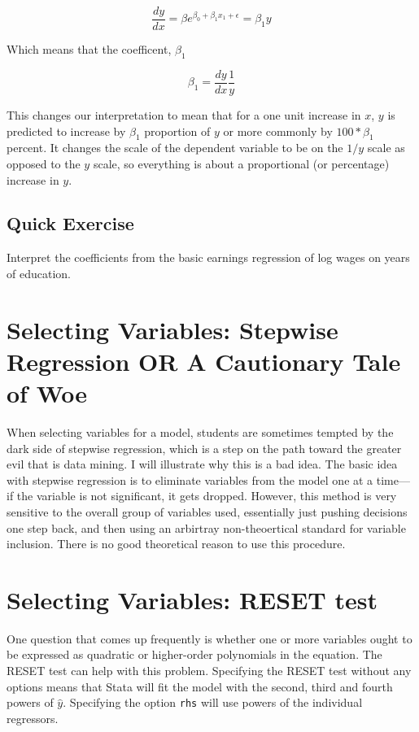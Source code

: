 \documentclass[12pt]{article}
\begin{document}
\begin{equation*}
  \frac{dy}{dx}=\beta e^{\beta_0+\beta_1x_1+\epsilon}=\beta_1y
\end{equation*}

Which means that the coefficent, $\beta_1$

\begin{equation*}
  \beta_1=\frac{dy}{dx}\frac{1}{y}
\end{equation*}

This changes our interpretation to mean that for a one unit increase
in $x$, $y$ is predicted to increase by $\beta_1$ proportion of $y$ or
more commonly by $100*\beta_1$ percent. It changes the scale of the
dependent variable to be on the $1/y$ scale as opposed to the $y$
scale, so everything is about a proportional (or percentage) increase
in $y$. 

\subsection{Quick Exercise}
\label{sec:quick-exercise}

Interpret the coefficients from the basic earnings regression of log
wages on years of education. 

\section{Selecting Variables: Stepwise Regression OR A Cautionary Tale of Woe}
\label{sec:select-vari-stepw}

When selecting variables for a model, students are sometimes tempted
by the dark side of stepwise regression, which is a step on the path
toward the greater evil that is data mining. I will illustrate why
this is a bad idea. The basic idea with stepwise regression is to
eliminate variables from the model one at a time---if the variable is
not significant, it gets dropped. However, this method is very
sensitive to the overall group of variables used, essentially just
pushing decisions one step back, and then using an arbirtray
non-theoertical standard for variable inclusion. There is no good theoretical
reason to use this procedure. 

\section{Selecting Variables: RESET  test}
\label{sec:select-vari-reset}

One question that comes up frequently is whether one or more variables
ought to be expressed as quadratic or higher-order polynomials in the
equation. The RESET test can help with this problem. Specifying the
RESET test without any options means that Stata will fit the model
with the second, third and fourth powers of $\hat{y}$. Specifying the
option \texttt{rhs} will use powers of the individual regressors.
\end{document}
